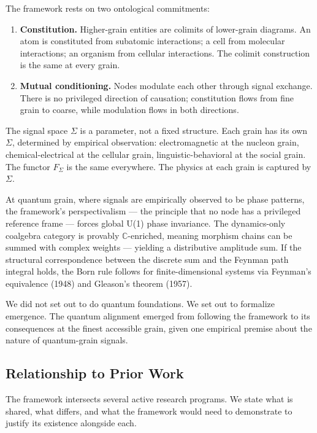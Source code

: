 \documentclass[12pt,a4paper]{article}
\begin{document}
The framework rests on two ontological commitments:

\begin{enumerate}
  \item \textbf{Constitution.} Higher-grain entities are colimits of lower-grain diagrams. An atom is constituted from subatomic interactions; a cell from molecular interactions; an organism from cellular interactions. The colimit construction is the same at every grain.

  \item \textbf{Mutual conditioning.} Nodes modulate each other through signal exchange. There is no privileged direction of causation; constitution flows from fine grain to coarse, while modulation flows in both directions.
\end{enumerate}

The signal space $\Sigma$ is a parameter, not a fixed structure. Each grain has its own $\Sigma$, determined by empirical observation: electromagnetic at the nucleon grain, chemical-electrical at the cellular grain, linguistic-behavioral at the social grain. The functor $F_\Sigma$ is the same everywhere. The physics at each grain is captured by $\Sigma$.

At quantum grain, where signals are empirically observed to be phase patterns, the framework's perspectivalism --- the principle that no node has a privileged reference frame --- forces global U(1) phase invariance. The dynamics-only coalgebra category is provably $\mathbb{C}$-enriched, meaning morphism chains can be summed with complex weights --- yielding a distributive amplitude sum. If the structural correspondence between the discrete sum and the Feynman path integral holds, the Born rule follows for finite-dimensional systems via Feynman's equivalence (1948) and Gleason's theorem (1957).

We did not set out to do quantum foundations. We set out to formalize emergence. The quantum alignment emerged from following the framework to its consequences at the finest accessible grain, given one empirical premise about the nature of quantum-grain signals.

\subsection{Relationship to Prior Work}
\label{sec:prior-work}

The framework intersects several active research programs. We state what is shared, what differs, and what the framework would need to demonstrate to justify its existence alongside each.
\end{document}
